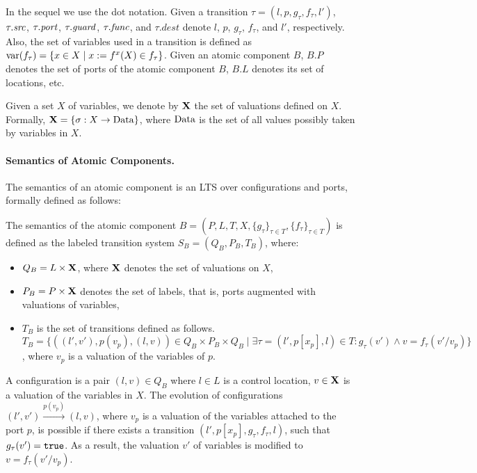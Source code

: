 In the sequel we use the dot notation.
Given a transition $\tau = (l,p,g_\tau,f_\tau,l')$, $\tau.\mathit{src}$, $\tau.\mathit{port}$, $\tau.\mathit{guard}$, $\tau.\mathit{func}$, and $\tau.dest$ denote $l$, $p$, $g_\tau$, $f_\tau$, and $l'$, respectively.
Also, the set of variables used in a transition is defined as $\operatorname{var}(f_\tau) = \{x \in X \mid x:= f^x(X) \in f_\tau\}$.
Given an atomic component $B$, $B.P$ denotes the set of ports of the atomic component $B$, $B.L$ denotes its set of locations, etc.

Given a set $X$ of variables, we denote by $\mathbf{X}$ the set of valuations
defined on $X$. Formally, $\mathbf{X} = \{ \sigma : X \rightarrow \mathit{\mathrm{Data}}\}$, where
$\mathit{\mathrm{Data}}$ is the set of all values possibly taken by variables in $X$.

%
\paragraph{Semantics of Atomic Components.}
The semantics of an atomic component is an LTS over configurations and ports, formally defined as follows:
%
\begin{definition}
The semantics of the atomic component $B = (P,L, T, X, \{g_{\tau}\}_{\tau \in T}, \{f_{\tau}\}_{\tau \in T})$ is defined as the labeled transition system  $S_B = (Q_B, P_B, T_B)$, where: 
\begin{itemize}
\item $Q_B = L\times \mathbf{X}$, where $\mathbf{X}$ denotes the set of valuations on $X$,
\item $P_B = P \times \mathbf{X}$ denotes the set of labels, that is, ports augmented with valuations of variables, 
\item $T_B$ is the set of transitions defined as follows. $T_B= \{ ((l',v'),p(v_{p}), (l,v))\in Q_B\times P_B\times Q_B \mid \exists \tau = (l', p[x_{p}], l) \in T: g_{\tau}(v') \wedge v=f_{\tau}(v'/v_{p})\}$, where $v_{p}$ is a valuation of the variables of $p$.  
\end{itemize}
\end{definition}
%
A configuration is a pair $(l,v)\in Q_B$ where $l \in L$ is a control location, $v \in \mathbf{X}$ is a valuation of the variables in $X$. The evolution of configurations $(l', v')\stackrel{p(v_{p})}{\rightarrow} (l, v)$, where $v_{p}$ is a valuation of the variables attached to the port $p$, is possible if there exists a transition $(l', p[x_p], g_\tau, f_\tau, l)$, such that $g_\tau(v')=\mathtt{true}$. As a result, the valuation $v'$ of variables is modified to $v=f_\tau(v'/v_p)$.
%
